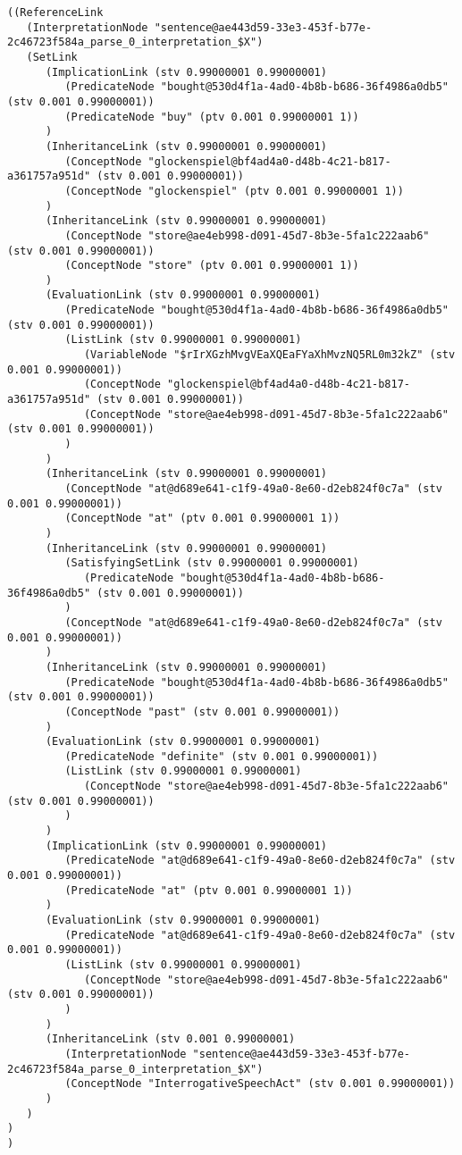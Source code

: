  {\tt\begin{tiny}\begin{lstlisting}
((ReferenceLink
   (InterpretationNode "sentence@ae443d59-33e3-453f-b77e-2c46723f584a_parse_0_interpretation_$X")
   (SetLink
      (ImplicationLink (stv 0.99000001 0.99000001)
         (PredicateNode "bought@530d4f1a-4ad0-4b8b-b686-36f4986a0db5" (stv 0.001 0.99000001))
         (PredicateNode "buy" (ptv 0.001 0.99000001 1))
      )
      (InheritanceLink (stv 0.99000001 0.99000001)
         (ConceptNode "glockenspiel@bf4ad4a0-d48b-4c21-b817-a361757a951d" (stv 0.001 0.99000001))
         (ConceptNode "glockenspiel" (ptv 0.001 0.99000001 1))
      )
      (InheritanceLink (stv 0.99000001 0.99000001)
         (ConceptNode "store@ae4eb998-d091-45d7-8b3e-5fa1c222aab6" (stv 0.001 0.99000001))
         (ConceptNode "store" (ptv 0.001 0.99000001 1))
      )
      (EvaluationLink (stv 0.99000001 0.99000001)
         (PredicateNode "bought@530d4f1a-4ad0-4b8b-b686-36f4986a0db5" (stv 0.001 0.99000001))
         (ListLink (stv 0.99000001 0.99000001)
            (VariableNode "$rIrXGzhMvgVEaXQEaFYaXhMvzNQ5RL0m32kZ" (stv 0.001 0.99000001))
            (ConceptNode "glockenspiel@bf4ad4a0-d48b-4c21-b817-a361757a951d" (stv 0.001 0.99000001))
            (ConceptNode "store@ae4eb998-d091-45d7-8b3e-5fa1c222aab6" (stv 0.001 0.99000001))
         )
      )
      (InheritanceLink (stv 0.99000001 0.99000001)
         (ConceptNode "at@d689e641-c1f9-49a0-8e60-d2eb824f0c7a" (stv 0.001 0.99000001))
         (ConceptNode "at" (ptv 0.001 0.99000001 1))
      )
      (InheritanceLink (stv 0.99000001 0.99000001)
         (SatisfyingSetLink (stv 0.99000001 0.99000001)
            (PredicateNode "bought@530d4f1a-4ad0-4b8b-b686-36f4986a0db5" (stv 0.001 0.99000001))
         )
         (ConceptNode "at@d689e641-c1f9-49a0-8e60-d2eb824f0c7a" (stv 0.001 0.99000001))
      )
      (InheritanceLink (stv 0.99000001 0.99000001)
         (PredicateNode "bought@530d4f1a-4ad0-4b8b-b686-36f4986a0db5" (stv 0.001 0.99000001))
         (ConceptNode "past" (stv 0.001 0.99000001))
      )
      (EvaluationLink (stv 0.99000001 0.99000001)
         (PredicateNode "definite" (stv 0.001 0.99000001))
         (ListLink (stv 0.99000001 0.99000001)
            (ConceptNode "store@ae4eb998-d091-45d7-8b3e-5fa1c222aab6" (stv 0.001 0.99000001))
         )
      )
      (ImplicationLink (stv 0.99000001 0.99000001)
         (PredicateNode "at@d689e641-c1f9-49a0-8e60-d2eb824f0c7a" (stv 0.001 0.99000001))
         (PredicateNode "at" (ptv 0.001 0.99000001 1))
      )
      (EvaluationLink (stv 0.99000001 0.99000001)
         (PredicateNode "at@d689e641-c1f9-49a0-8e60-d2eb824f0c7a" (stv 0.001 0.99000001))
         (ListLink (stv 0.99000001 0.99000001)
            (ConceptNode "store@ae4eb998-d091-45d7-8b3e-5fa1c222aab6" (stv 0.001 0.99000001))
         )
      )
      (InheritanceLink (stv 0.001 0.99000001)
         (InterpretationNode "sentence@ae443d59-33e3-453f-b77e-2c46723f584a_parse_0_interpretation_$X")
         (ConceptNode "InterrogativeSpeechAct" (stv 0.001 0.99000001))
      )
   )
)
)

\end{lstlisting}\end{tiny}}

